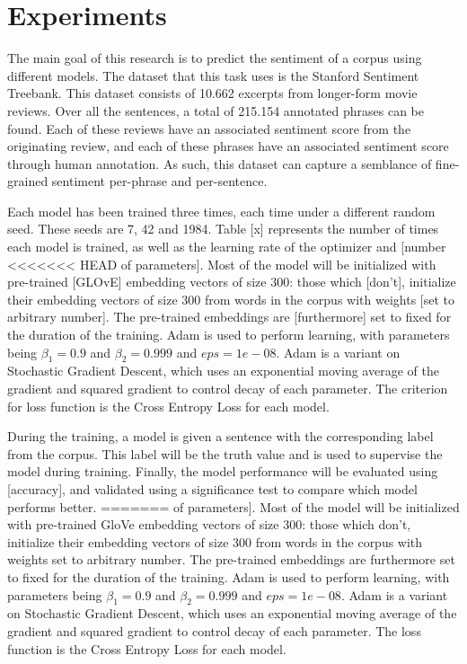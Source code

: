 \section{Experiments}
\label{sec: experiments}
The main goal of this research is to predict the sentiment of a corpus using
different models. The dataset that this task uses is the Stanford
Sentiment Treebank\cite{socher2013recursive}. This dataset consists of 10.662
excerpts from longer-form movie reviews. Over all the sentences, a total of
215.154 annotated phrases can be found. Each of these reviews have an associated
sentiment score from the originating review, and each of these phrases have an
associated sentiment score through human annotation. As such, this dataset can 
capture a semblance of fine-grained sentiment per-phrase and per-sentence.

Each model has been trained three times, each time under a different random
seed. These seeds are 7, 42 and 1984. Table [x] represents the number of times
each model is trained, as well as the learning rate of the optimizer and [number
<<<<<<< HEAD
of parameters]. Most of the model will be initialized with pre-trained [GLOvE]
embedding vectors of size 300: those which [don't], initialize their embedding
vectors of size 300 from words in the corpus with weights [set to arbitrary
number]. The pre-trained embeddings are [furthermore] set to fixed for the
duration of the training. Adam\cite{DBLP:journals/corr/KingmaB14} is used to
perform learning, with parameters being $\beta_{1}=0.9$ and $\beta_{2}=0.999$
and $eps=1e-08$. Adam is a variant on Stochastic Gradient Descent, which uses an
exponential moving average of the gradient and squared gradient to control decay
of each parameter. The criterion for loss function is the Cross Entropy Loss for
each model.

During the training, a model is given a sentence with the corresponding label
from the corpus. This label will be the truth value and is used to supervise the
model during training. Finally, the model performance will be evaluated using [accuracy],
and validated using a significance test to compare which model performs better.
=======
of parameters]. Most of the model will be initialized with pre-trained
GloVe\cite{pennington2014glove} embedding vectors of size 300: those which
don't, initialize their embedding vectors of size 300 from words in the corpus
with weights set to arbitrary number. The pre-trained embeddings are furthermore
set to fixed for the duration of the training.
Adam\cite{DBLP:journals/corr/KingmaB14} is used to perform learning, with
parameters being $\beta_{1}=0.9$ and $\beta_{2}=0.999$ and $eps=1e-08$. Adam is
a variant on Stochastic Gradient Descent, which uses an exponential moving
average of the gradient and squared gradient to control decay of each parameter.
The loss function is the Cross Entropy Loss for each model.

